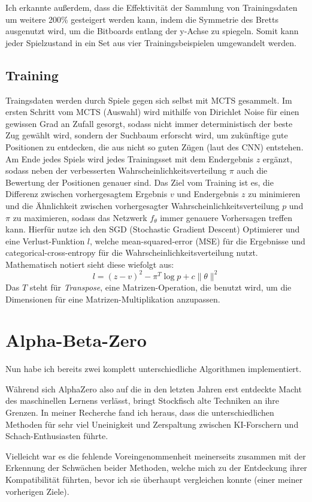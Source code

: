 \documentclass{jpp}
\begin{document}
Ich erkannte außerdem, dass die Effektivität der Sammlung von Trainingsdaten um weitere 200\% gesteigert werden kann, indem die Symmetrie des Bretts ausgenutzt wird, um die Bitboards entlang der y-Achse zu spiegeln. Somit kann jeder Spielzustand in ein Set aus vier Trainingsbeispielen umgewandelt werden.


\subsection{Training}
Traingsdaten werden durch Spiele gegen sich selbst mit MCTS gesammelt. Im ersten Schritt vom MCTS (Auswahl) wird mithilfe von Dirichlet Noise für einen gewissen Grad an Zufall gesorgt, sodass nicht immer deterministisch der beste Zug gewählt wird, sondern der Suchbaum erforscht wird, um zukünftige gute Positionen zu entdecken, die aus nicht so guten Zügen (laut des CNN) entstehen. 
Am Ende jedes Spiels wird jedes Trainingsset mit dem Endergebnis $z$ ergänzt, sodass neben der verbesserten Wahrscheinlichkeitsverteilung $\pi$ auch die Bewertung der Positionen genauer sind. Das Ziel vom Training ist es, die Differenz zwischen vorhergesagtem Ergebnis $v$ und Endergebnis $z$ zu minimieren und die Ähnlichkeit zwischen vorhergesagter Wahrscheinlichkeitsverteilung $p$ und $\pi$ zu maximieren, sodass das Netzwerk $f_\theta$ immer genauere Vorhersagen treffen kann.
Hierfür nutze ich den SGD (Stochastic Gradient Descent) Optimierer und eine Verlust-Funktion $l$, welche mean-squared-error (MSE) für die Ergebnisse und categorical-cross-entropy für die Wahrscheinlichkeitsverteilung nutzt. Mathematisch notiert sieht diese wiefolgt aus:
\[
l = (z - v)^2 - \pi^T \log p + c\lVert \theta \rVert^2
\]
Das $T$ steht für \textit{Transpose}, eine Matrizen-Operation, die benutzt wird, um die Dimensionen für eine Matrizen-Multiplikation anzupassen.

\section{Alpha-Beta-Zero}
Nun habe ich bereits zwei komplett unterschiedliche Algorithmen implementiert.

Während sich AlphaZero also auf die in den letzten Jahren erst entdeckte Macht des maschinellen Lernens verlässt, bringt Stockfisch alte Techniken an ihre Grenzen. In meiner Recherche fand ich heraus, dass die unterschiedlichen Methoden für sehr viel Uneinigkeit und Zerspaltung zwischen KI-Forschern und Schach-Enthusiasten führte.

Vielleicht war es die fehlende Voreingenommenheit meinerseits zusammen mit der Erkennung der Schwächen beider Methoden, welche mich zu der Entdeckung ihrer Kompatibilität führten, bevor ich sie überhaupt vergleichen konnte (einer meiner vorherigen Ziele).
\end{document}
